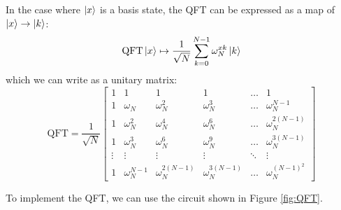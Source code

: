 \documentclass[reqno]{amsart}
\numberwithin{equation}{section}
\numberwithin{figure}{section}
\begin{document}
\begin{justify}
    In the case where $\ket{x}$ is a basis state, the QFT can be expressed as a map of $\ket{x} \rightarrow \ket{k}$:
    \begin{equation}
        \text{QFT}\ket{x} \mapsto \frac{1}{\sqrt{N}}\sum\limits_{k=0}^{N-1}\omega_{N}^{xk}\ket{k}
    \end{equation}
    which we can write as a unitary matrix:
    \begin{equation}
        \text{QFT} = \frac{1}{\sqrt{N}}\begin{bmatrix}
                                        1 & 1 & 1 & 1 & \ldots & 1 \\
                                        1 & \omega_{N} & \omega_{N}^{2} & \omega_{N}^{3} & \ldots & \omega_{N}^{N-1} \\
                                        1 & \omega_{N}^{2} & \omega_{N}^{4} & \omega_{N}^{6} & \ldots & \omega_{N}^{2(N-1)} \\
                                        1 & \omega_{N}^{3} & \omega_{N}^{6} & \omega_{N}^{9} & \ldots & \omega_{N}^{3(N-1)} \\
                                        \vdots & \vdots & \vdots & \vdots & \ddots & \vdots \\
                                        1 & \omega_{N}^{N-1} & \omega_{N}^{2(N-1)} & \omega_{N}^{3(N-1)} & \ldots & \omega_{N}^{(N-1)^{2}}
                                    \end{bmatrix}
    \end{equation}
    
    To implement the QFT, we can use the circuit shown in Figure \ref{fig:QFT}.
\end{justify}
\end{document}
